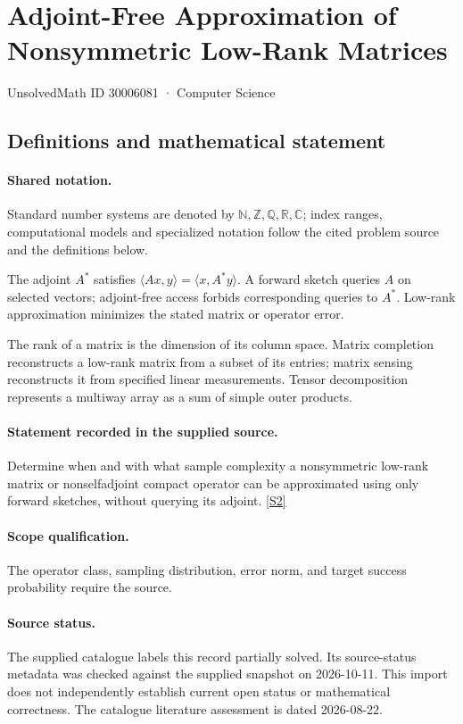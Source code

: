 \documentclass[11pt]{article}
\newcommand{\sref}[2]{\hyperlink{source:#1:#2}{[S#2]}}
\begin{document}
\setcounter{section}{30006080}
\section{Adjoint-Free Approximation of Nonsymmetric Low-Rank Matrices}\label{30006081}
{\small\sffamily UnsolvedMath ID 30006081 · Computer Science}
\subsection{Definitions and mathematical statement}

\paragraph{Shared notation.}Standard number systems are denoted by $\mathbb N,\mathbb Z,\mathbb Q,\mathbb R,\mathbb C$; index ranges, computational models and specialized notation follow the cited problem source and the definitions below.


The adjoint $A^*$ satisfies $\langle Ax,y\rangle=\langle x,A^*y\rangle$. A forward sketch queries $A$ on selected vectors; adjoint-free access forbids corresponding queries to $A^*$. Low-rank approximation minimizes the stated matrix or operator error.

The rank of a matrix is the dimension of its column space. Matrix completion reconstructs a low-rank matrix from a subset of its entries; matrix sensing reconstructs it from specified linear measurements. Tensor decomposition represents a multiway array as a sum of simple outer products.
\paragraph{Statement recorded in the supplied source.}
Determine when and with what sample complexity a nonsymmetric low-rank matrix or nonselfadjoint compact operator can be approximated using only forward sketches, without querying its adjoint. \sref{30006081}{2}
\paragraph{Scope qualification.}
The operator class, sampling distribution, error norm, and target success probability require the source.
\paragraph{Source status.}
The supplied catalogue labels this record partially solved. Its source-status metadata was checked against the supplied snapshot on 2026-10-11. This import does not independently establish current open status or mathematical correctness. The catalogue literature assessment is dated 2026-08-22.
\end{document}
